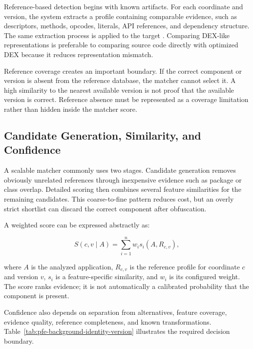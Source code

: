 Reference-based detection begins with known artifacts. For each coordinate
and version, the system extracts a profile containing comparable evidence,
such as descriptors, methods, opcodes, literals, API references, and
dependency structure. The same extraction process is applied to the target
\APK. Comparing DEX-like representations is preferable to comparing source
code directly with optimized DEX because it reduces representation mismatch.

Reference coverage creates an important boundary. If the correct component or
version is absent from the reference database, the matcher cannot select it.
A high similarity to the nearest available version is not proof that the
available version is correct. Reference absence must be represented as a
coverage limitation rather than hidden inside the matcher score.

\subsection{Candidate Generation, Similarity, and Confidence}

A scalable matcher commonly uses two stages. Candidate generation removes
obviously unrelated references through inexpensive evidence such as package
or class overlap. Detailed scoring then combines several feature similarities
for the remaining candidates. This coarse-to-fine pattern reduces cost, but an
overly strict shortlist can discard the correct component after obfuscation.

A weighted score can be expressed abstractly as:

\begin{equation}
\label{eq:pfe-background-weighted-score}
S(c,v \mid A) = \sum_{i=1}^{n} w_i s_i(A,R_{c,v}),
\end{equation}

where \(A\) is the analyzed application, \(R_{c,v}\) is the reference profile
for coordinate \(c\) and version \(v\), \(s_i\) is a feature-specific
similarity, and \(w_i\) is its configured weight. The score ranks evidence; it
is not automatically a calibrated probability that the component is present.

Confidence also depends on separation from alternatives, feature coverage,
evidence quality, reference completeness, and known transformations.
Table~\ref{tab:pfe-background-identity-version} illustrates the required
decision boundary.

